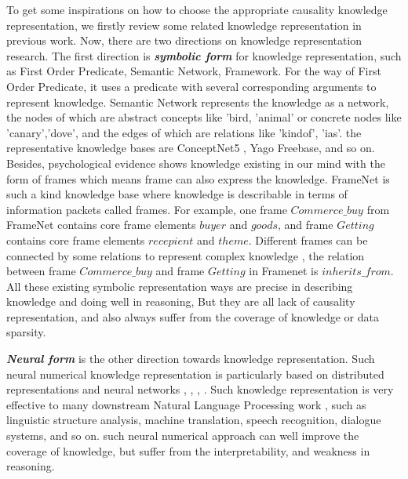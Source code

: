 To get some inspirations on how to choose the appropriate causality knowledge representation, we firstly review some related knowledge representation in previous work. 
Now, there are two directions on knowledge representation research. 
The first direction is \textbf{\textit{symbolic form}} for knowledge representation, such as First Order Predicate, Semantic Network, Framework. For the way of First Order Predicate, it uses a predicate with several corresponding arguments to represent knowledge. 
Semantic Network represents the knowledge as a network, the nodes of which are abstract concepts like 'bird, 'animal' or concrete nodes like 'canary','dove', and the edges of which are relations like 'kindof', 'ias'. the representative knowledge bases are ConceptNet5 \cite{speer2013conceptnet}, Yago\cite{suchanek2007yago} Freebase\cite{bollacker2008freebase}, and so on. 
Besides, psychological evidence shows knowledge existing in our mind with the form of frames which means frame can also express the knowledge. FrameNet\cite{baker1998berkeley} is such a kind knowledge base where knowledge is describable in terms of information packets called frames. For example, one frame $Commerce\_buy$ from FrameNet contains core frame elements $buyer$ and $goods$, and frame $Getting$ contains core frame elements $recepient$ and $theme$. Different frames can be connected by some relations to represent complex knowledge , the relation between frame $Commerce\_buy$ and frame $Getting$ in Framenet is  $inherits\_from$. All these existing symbolic representation ways are precise in describing knowledge and doing well in reasoning, But they are all lack of causality representation, and also always suffer from the coverage of knowledge or data sparsity. 

\textbf{\textit{Neural form}} is the other direction towards knowledge representation. Such neural numerical knowledge representation is particularly based on distributed representations \citealp{mikolov2013distributed} and neural networks \cite{socher2013reasoning}, \citealp{bordes2013translating}, \cite{bordes2014question}, \cite{bordes2014semantic} \cite{li-16}. Such knowledge representation is very effective to many downstream Natural Language Processing work \cite{hirschberg2015advances}, such as linguistic structure analysis, machine translation, speech recognition, dialogue systems, and so on. such neural numerical approach can well improve the coverage of knowledge, but suffer from the interpretability, and weakness in reasoning.

